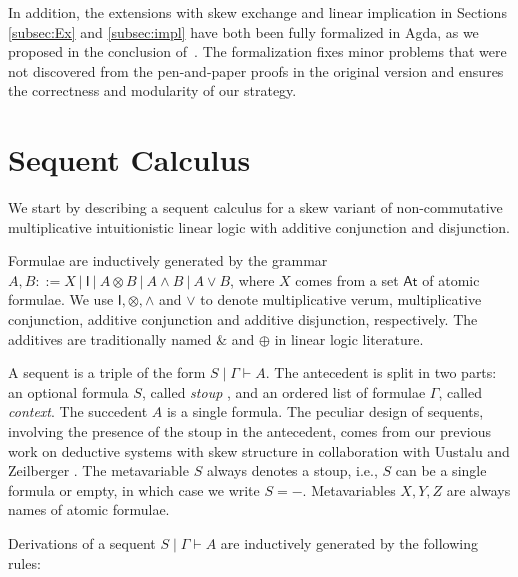 \documentclass[submission,copyright,creativecommons]{eptcs}
\theoremstyle{definition}
\newcommand{\ot}{\otimes}
\newcommand{\I}{\mathsf{I}}
\begin{document}
In addition, the extensions with skew exchange and linear implication in Sections \ref{subsec:Ex} and \ref{subsec:impl} have both been fully formalized in Agda, as we proposed in the conclusion of~\cite{VW:2023}. The formalization fixes minor problems that were not discovered from the pen-and-paper proofs in the original version and ensures the correctness and modularity of our strategy.

\section{Sequent Calculus}\label{sec:sequent-calculus}
We start by describing a sequent calculus for a skew variant of non-commutative multiplicative intuitionistic linear logic with additive conjunction and disjunction.

Formulae are inductively generated by the grammar $A,B ::= X \ | \ \I \ | \ A \ot B \ | \ A \land B \ | \ A \lor B$, where $X$ comes from a set $\mathsf{At}$ of atomic formulae. 
We use $\I , \ot , \land$ and $\lor$ to denote multiplicative verum, multiplicative conjunction, additive conjunction and additive disjunction, respectively. The additives are traditionally named $\&$ and $\oplus$ in linear logic literature.

A sequent is a triple of the form $S \mid \Gamma \vdash A$.
The antecedent is split in two parts: an optional formula $S$, called \emph{stoup} \cite{girard:constructive:91}, and an ordered list of formulae $\Gamma$, called \emph{context}.
The succedent $A$ is a single formula.
The peculiar design of sequents, involving the presence of the stoup in the antecedent, comes from our previous work on deductive systems with skew structure in collaboration with Uustalu and Zeilberger \cite{uustalu:sequent:2021,uustalu:proof:nodate,uustalu:deductive:nodate,veltri:coherence:2021,UVW:protsn,veltri:multifocus:23,Veltri25}.
The metavariable $S$ always denotes a stoup, i.e., $S$ can be a single formula or empty, in which case we write $S = {-}$. Metavariables $X,Y,Z$ are always names of atomic formulae.

Derivations of a sequent $S \mid \Gamma \vdash A$ are inductively generated by the following rules:
\end{document}
